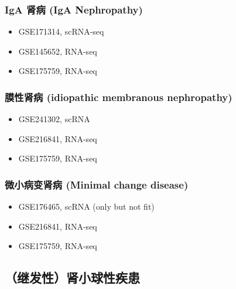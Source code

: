 \documentclass[
]{article}
\providecommand{\tightlist}{%
  \setlength{\itemsep}{0pt}\setlength{\parskip}{0pt}}
\begin{document}
\hypertarget{iga-ux80beux75c5-iga-nephropathy}{%
\subsubsection{IgA 肾病 (IgA Nephropathy)}\label{iga-ux80beux75c5-iga-nephropathy}}

\begin{itemize}
\tightlist
\item
  GSE171314, scRNA-seq
\item
  GSE145652, RNA-seq
\item
  GSE175759, RNA-seq
\end{itemize}

\hypertarget{ux819cux6027ux80beux75c5-idiopathic-membranous-nephropathy}{%
\subsubsection{膜性肾病 (idiopathic membranous nephropathy)}\label{ux819cux6027ux80beux75c5-idiopathic-membranous-nephropathy}}

\begin{itemize}
\tightlist
\item
  GSE241302, scRNA
\item
  GSE216841, RNA-seq
\item
  GSE175759, RNA-seq
\end{itemize}

\hypertarget{ux5faeux5c0fux75c5ux53d8ux80beux75c5-minimal-change-disease}{%
\subsubsection{微小病变肾病 (Minimal change disease)}\label{ux5faeux5c0fux75c5ux53d8ux80beux75c5-minimal-change-disease}}

\begin{itemize}
\tightlist
\item
  GSE176465, scRNA (only but not fit)
\item
  GSE216841, RNA-seq
\item
  GSE175759, RNA-seq
\end{itemize}

\hypertarget{ux7ee7ux53d1ux6027ux80beux5c0fux7403ux6027ux75beux60a3}{%
\subsection{（继发性）肾小球性疾患}\label{ux7ee7ux53d1ux6027ux80beux5c0fux7403ux6027ux75beux60a3}}
\end{document}
